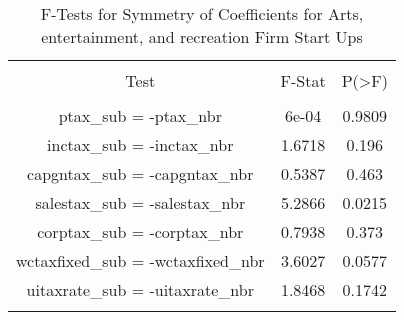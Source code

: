 
\begin{table}[!htbp] \centering 
  \caption{F-Tests for Symmetry of Coefficients for Arts, entertainment, and recreation Firm Start Ups} 
  \label{71Ftests} 
\begin{tabular}{@{\extracolsep{5pt}} ccc} 
\\[-1.8ex]\hline 
\hline \\[-1.8ex] 
Test & F-Stat & P(\textgreater F) \\ 
\hline \\[-1.8ex] 
ptax\_sub = -ptax\_nbr & 6e-04 & 0.9809 \\ 
inctax\_sub = -inctax\_nbr & 1.6718 & 0.196 \\ 
capgntax\_sub = -capgntax\_nbr & 0.5387 & 0.463 \\ 
salestax\_sub = -salestax\_nbr & 5.2866 & 0.0215 \\ 
corptax\_sub = -corptax\_nbr & 0.7938 & 0.373 \\ 
wctaxfixed\_sub = -wctaxfixed\_nbr & 3.6027 & 0.0577 \\ 
uitaxrate\_sub = -uitaxrate\_nbr & 1.8468 & 0.1742 \\ 
\hline \\[-1.8ex] 
\end{tabular} 
\end{table} 
